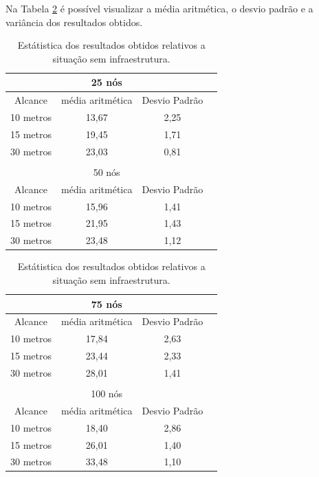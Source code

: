 	Na Tabela \ref{tab:estatiscaResultadosObtidosSemInfraestrutura} é possível visualizar a média aritmética, o desvio padrão e a variância dos resultados obtidos. 

	\begin{table}[!htb]
	    \caption{Estátistica dos resultados obtidos relativos a situação sem infraestrutura.}
	    \label{tab:estatiscaResultadosObtidosSemInfraestrutura}
	    \centering
	    \scriptsize
	    \begin{minipage}{.5\linewidth}
	      
	      \centering
	        \begin{tabular}{|c|c|c|c|}

			\hline
			\multicolumn{3}{|c|}{25 nós} \\ \hline
			Alcance   & média aritmética &	Desvio Padrão  \\ \hline
			10 metros &	13,67 & 2,25  \\ \hline
			15 metros &	19,45 & 1,71   \\ \hline
			30 metros &	23,03 & 0,81  \\ \hline

			\multicolumn{3}{|c|}{} \\ \hline

			\multicolumn{3}{|c|}{50 nós} \\ \hline
			Alcance   & média aritmética &	Desvio Padrão \\ \hline
			10 metros &	15,96	& 1,41   \\ \hline
			15 metros &	21,95	& 1,43   \\ \hline
			30 metros &	23,48	& 1,12  \\ \hline

		\end{tabular}
	    \end{minipage}%
	    \begin{minipage}{.5\linewidth}
	      \centering
	        \begin{tabular}{|c|c|c|c|}
	        \hline
			\multicolumn{3}{|c|}{75 nós} \\ \hline
			Alcance   & média aritmética &	Desvio Padrão   \\ \hline
			10 metros &	17,84 & 2,63   \\ \hline
			15 metros &	23,44 & 2,33   \\ \hline
			30 metros &	28,01 & 1,41  \\ \hline

			\multicolumn{3}{|c|}{} \\ \hline


			\multicolumn{3}{|c|}{100 nós} \\ \hline
			Alcance   & média aritmética &	Desvio Padrão   \\ \hline
			10 metros &	18,40	& 2,86   \\ \hline
			15 metros &	26,01	& 1,40   \\ \hline
			30 metros &	33,48	& 1,10  \\ \hline

		\end{tabular}

	    \end{minipage} 
	\end{table}


